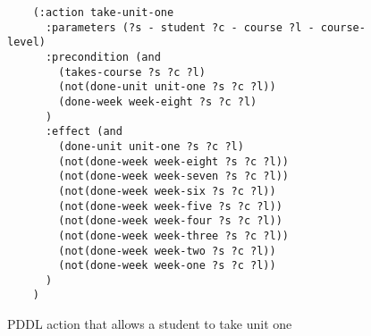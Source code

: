 \begin{figure}[t]
    \begin{lstlisting}
    (:action take-unit-one
      :parameters (?s - student ?c - course ?l - course-level)
      :precondition (and 
        (takes-course ?s ?c ?l)
        (not(done-unit unit-one ?s ?c ?l))
        (done-week week-eight ?s ?c ?l)
      )
      :effect (and
        (done-unit unit-one ?s ?c ?l)
        (not(done-week week-eight ?s ?c ?l))
        (not(done-week week-seven ?s ?c ?l))
        (not(done-week week-six ?s ?c ?l))
        (not(done-week week-five ?s ?c ?l))
        (not(done-week week-four ?s ?c ?l))
        (not(done-week week-three ?s ?c ?l))
        (not(done-week week-two ?s ?c ?l))
        (not(done-week week-one ?s ?c ?l))
      )
    )
    \end{lstlisting}
    \caption{PDDL action that allows a student to take unit one}\label{fig:pddl-action-take-unit-one}
\end{figure}